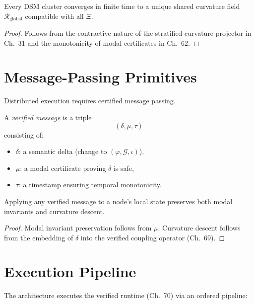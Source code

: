 \begin{theorem}
Every DSM cluster converges in finite time to a unique shared curvature field 
$\mathcal{R}_{\mathrm{global}}$ compatible with all $\Xi$.
\end{theorem}

\begin{proof}
Follows from the contractive nature of the stratified curvature projector in 
Ch.~31 and the monotonicity of modal certificates in Ch.~62.
\end{proof}

\section{Message-Passing Primitives}

Distributed execution requires certified message passing.

\begin{definition}
A \emph{verified message} is a triple
\[
(\delta,\mu,\tau)
\]
consisting of:
\begin{itemize}
\item $\delta$: a semantic delta (change to $(\varphi,\mathcal{G},\iota)$),
\item $\mu$: a modal certificate proving $\delta$ is safe,
\item $\tau$: a timestamp ensuring temporal monotonicity.
\end{itemize}
\end{definition}

\begin{theorem}
Applying any verified message to a node's local state preserves both modal 
invariants and curvature descent.
\end{theorem}

\begin{proof}
Modal invariant preservation follows from $\mu$.  
Curvature descent follows from the embedding of $\delta$ into the verified 
coupling operator (Ch.~69).
\end{proof}

\section{Execution Pipeline}

The architecture executes the verified runtime (Ch.~70) via an ordered pipeline:

